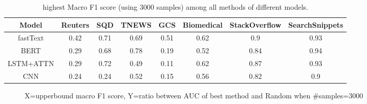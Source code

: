 \begin{enumerate}
\begin{table}[th]
	\scriptsize
	\centering
	\begin{tabular}{cccccccc}
		\toprule
		Model & Reuters    & SQD   & TNEWS   & GCS& Biomedical & StackOverflow & SearchSnippets\\ \hline
		fastText & 0.42 & 0.71 & 0.69 & 0.51 & 0.62 & 0.9 & 0.93\\
		BERT & 0.29 & 0.68 & 0.78 & 0.19 & 0.52 & 0.84 & 0.94\\
		LSTM+ATTN & 0.29 & 0.72 & 0.49 & 0.11 & 0.62 & 0.87 & 0.93\\
		CNN & 0.24 & 0.24 & 0.52 & 0.15 & 0.56 & 0.82 & 0.9\\
		\bottomrule
	\end{tabular}
	\caption{highest Macro F1 score (using 3000 samples) among all methods of different models.}
	\label{table:upperbound_3000}
\end{table}

\begin{figure}[th!]%
	\noindent
	\begin{center}
	\end{center}
	\begin{center}
	\end{center}
	\noindent
	\caption{X=upperbound macro F1 score, Y=ratio between AUC of best method and Random when \#samples=3000}
	\label{fig:f1_ratio}
\end{figure}



\end{enumerate}
